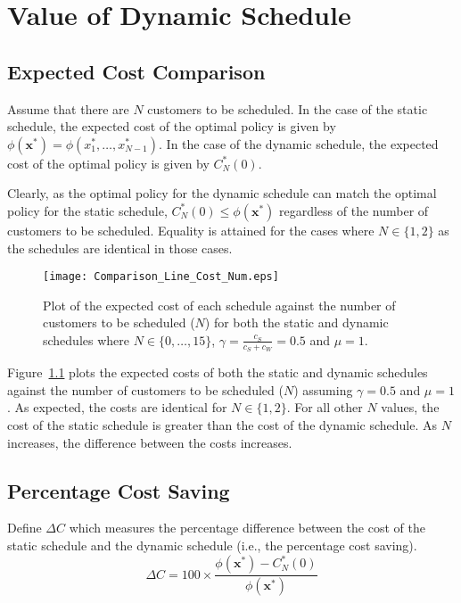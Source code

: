 \chapter{Value of Dynamic Schedule}

\section{Expected Cost Comparison}

Assume that there are $N$ customers to be scheduled. In the case of the static schedule, the expected cost of the optimal policy is given by $\phi (\mathbf{x}^{*}) = \phi (x_{1}^{*}, \ldots, x_{N - 1}^{*})$. In the case of the dynamic schedule, the expected cost of the optimal policy is given by $C_{N}^{*} (0)$.

Clearly, as the optimal policy for the dynamic schedule can match the optimal policy for the static schedule, $C_{N}^{*} (0) \leq \phi (\mathbf{x}^{*})$ regardless of the number of customers to be scheduled. Equality is attained for the cases where $N \in \{ 1, 2 \}$ as the schedules are identical in those cases.

\begin{figure}[htb]
	\centering
	\texttt{[image: Comparison\_Line\_Cost\_Num.eps]}
	\caption{Plot of the expected cost of each schedule against the number of customers to be scheduled ($N$) for both the static and dynamic schedules where $N \in \{ 0, \ldots, 15 \}$, $\gamma = \frac{c_{S}}{c_{S} + c_{W}} = 0.5$ and $\mu = 1$.}
	\label{Graph_Cost_Comparison}
\end{figure}

Figure~\ref{Graph_Cost_Comparison} plots the expected costs of both the static and dynamic schedules against the number of customers to be scheduled ($N$) assuming $\gamma = 0.5$ and $\mu = 1$. As expected, the costs are identical for $N \in \{ 1, 2 \}$. For all other $N$ values, the cost of the static schedule is greater than the cost of the dynamic schedule. As $N$ increases, the difference between the costs increases.

\section{Percentage Cost Saving}

Define $\Delta C$  which measures the percentage difference between the cost of the static schedule and the dynamic schedule (i.e., the percentage cost saving).
\begin{equation}
	\Delta C = 100 \times \frac{\phi (\mathbf{x}^{*}) - C_{N}^{*} (0)}{\phi (\mathbf{x}^{*})}
\end{equation}

